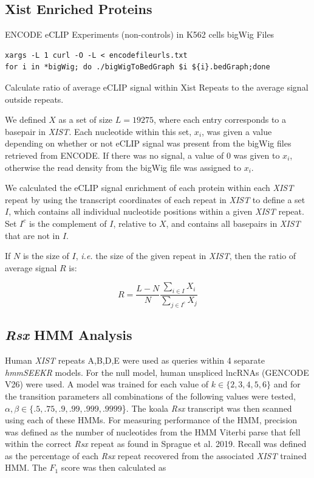\subsection{Xist Enriched Proteins}

ENCODE eCLIP Experiments (non-controls) in K562 cells bigWig Files
\begin{verbatim}
xargs -L 1 curl -O -L < encodefileurls.txt
for i in *bigWig; do ./bigWigToBedGraph $i ${i}.bedGraph;done
\end{verbatim}



Calculate ratio of average eCLIP signal within Xist Repeats to the average signal outside repeats. 

We defined $X$ as a set of size $L = 19275$, where each entry corresponds to a basepair in \emph{XIST}. Each nucleotide within this set, $x_i$, was given a value depending on whether or not eCLIP signal was present from the bigWig files retrieved from ENCODE. If there was no signal, a value of 0 was given to $x_i$, otherwise the read density from the bigWig file was assigned to $x_i$.

We calculated the eCLIP signal enrichment of each protein within each \emph{XIST} repeat by using the transcript coordinates of each repeat in \emph{XIST} to define a set $I$, which contains all individual nucleotide positions within a given \emph{XIST} repeat. Set $I^c$ is the complement of $I$, relative to $X$,  and contains all basepairs in \emph{XIST} that are not in $I$. 

If $N$ is the size of $I$, \emph{i.e.} the size of the given repeat in \emph{XIST}, then the ratio of average signal $R$ is:

$$R = \frac{L-N}{N}\frac{\sum_{i\in{I}}{X_i}}{{\sum_{j\in{I^c}}{X_j}}}$$

\subsection{\emph{Rsx} HMM Analysis}

Human \emph{XIST} repeats A,B,D,E were used as queries within 4 separate \emph{hmmSEEKR} models. For the null model, human unspliced lncRNAs (GENCODE V26) were used. A model was trained for each value of $k \in \{2,3,4,5,6\}$ and for the transition parameters all combinations of the following values were tested, $\alpha,\beta \in \{.5, .75, .9, .99, .999, .9999$\}. The koala \emph{Rsx} transcript was then scanned using each of these HMMs. For measuring performance of the HMM, precision was defined as the number of nucleotides from the HMM Viterbi parse that fell within the correct \emph{Rsx} repeat as found in Sprague et al. 2019. Recall was defined as the percentage of each \emph{Rsx} repeat recovered from the associated \emph{XIST} trained HMM. The $F_1$ score was then calculated as 

